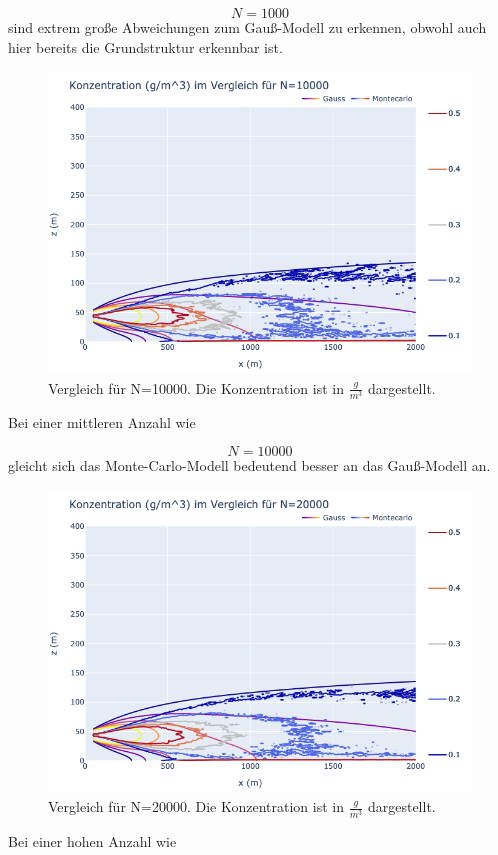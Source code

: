 \documentclass[ngerman]{scrartcl}
\begin{document}
\begin{equation}
	N=1000
\end{equation}
sind extrem große Abweichungen zum Gauß-Modell zu erkennen, obwohl auch hier bereits die Grundstruktur erkennbar ist.
\begin{figure}[H]
	\centering
	\includegraphics[scale=0.5]{Bilder/1b10k.png}
	\caption{Vergleich für N=10000. Die Konzentration ist in $\frac{\si{g}}{\si{m^3}}$ dargestellt.}
	\label{fig:my_label}
\end{figure}
Bei einer mittleren Anzahl wie 

\begin{equation}
	N=10000
\end{equation}
gleicht sich das Monte-Carlo-Modell bedeutend besser an das Gauß-Modell an.
\begin{figure}[H]
	\centering
	\includegraphics[scale=0.5]{Bilder/1b20k.png}
	\caption{Vergleich für N=20000. Die Konzentration ist in $\frac{\si{g}}{\si{m^3}}$ dargestellt.}
	\label{fig:my_label}
\end{figure}
Bei einer hohen Anzahl wie 
\end{document}
